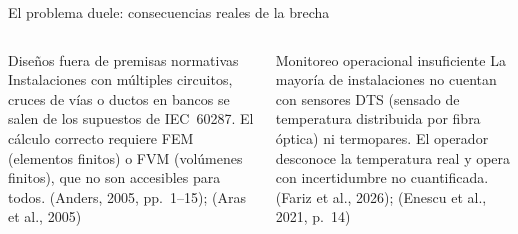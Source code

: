 \documentclass[aspectratio=169]{beamer}
\newcommand{\refcite}[1]{{\footnotesize\color{gray!70!black} #1}}
\begin{document}
\begin{frame}{El problema duele: consecuencias reales de la brecha}
\vspace{0.2em}
\begin{columns}[T]
\begin{block}{Diseños fuera de premisas normativas}
\scriptsize
Instalaciones con múltiples circuitos, cruces de vías o ductos en bancos se
salen de los supuestos de IEC~60287. El cálculo correcto requiere
FEM (elementos finitos) o FVM (volúmenes finitos), que no son accesibles para todos.
\refcite{(Anders, 2005, pp.~1--15); (Aras et al., 2005)}
\end{block}
\begin{block}{Monitoreo operacional insuficiente}
\scriptsize
La mayoría de instalaciones no cuentan con sensores DTS (sensado de
temperatura distribuida por fibra óptica) ni termopares. El operador
desconoce la temperatura real y opera con incertidumbre no cuantificada.
\refcite{(Fariz et al., 2026); (Enescu et al., 2021, p.~14)}
\end{block}
\end{columns}
\end{frame}
\end{document}
